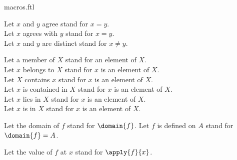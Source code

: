 \documentclass{stex}
\begin{document}
\begin{smodule}{macros.ftl}

  \begin{forthel}
    Let $x$ and $y$ agree stand for $x = y$.\\
    Let $x$ agrees with $y$ stand for $x = y$.\\
    Let $x$ and $y$ are distinct stand for $x \neq y$.
  \end{forthel}

  \begin{forthel}
    Let a member of $X$ stand for an element of $X$.\\
    Let $x$ belongs to $X$ stand for $x$ is an element of $X$.\\
    Let $X$ contains $x$ stand for $x$ is an element of $X$.\\
    Let $x$ is contained in $X$ stand for $x$ is an element of $X$.\\
    Let $x$ lies in $X$ stand for $x$ is an element of $X$.\\
    Let $x$ is in $X$ stand for $x$ is an element of $X$.
  \end{forthel}

  \begin{fconvention*}
    Let the domain of $f$ stand for $\domain{f}$.
    Let $f$ is defined on $A$ stand for $\domain{f} = A$.
  \end{fconvention*}

  \begin{forthel}
    Let the value of $f$ at $x$ stand for $\apply{f}{x}$.
  \end{forthel}
\end{smodule}
\end{document}
